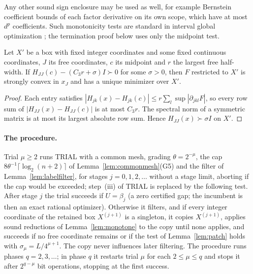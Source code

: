Any other sound sign enclosure may be used as well, for example Bernstein
coefficient bounds \cite{Garloff1986} of each factor derivative on its own
scope, which have at most $d^p$ coefficients. Such monotonicity tests are
standard in interval global optimization
\cite{Hansen1980,HansenWalster2004,ArayaTrombettoniNeveu2010}; the
termination proof below uses only the midpoint test.

\begin{lemma}\label{lem:patch}
Let $X'$ be a box with fixed integer coordinates and some fixed continuous
coordinates, $J$ its free coordinates, $c$ its midpoint and $r$ the largest
free half-width. If $H_{JJ}(c)-(C_3r+\sigma)I\succ0$ for some
$\sigma>0$, then $F$ restricted to $X'$ is strongly convex in $x_J$ and has a
unique minimizer over $X'$.
\end{lemma}

\begin{proof}
Each entry satisfies $|H_{jk}(x)-H_{jk}(c)|\le r\sum_l\sup|\partial_{jkl}F|$,
so every row sum of $|H_{JJ}(x)-H_{JJ}(c)|$ is at most $C_3r$. The spectral
norm of a symmetric matrix is at most its largest absolute row sum. Hence
$H_{JJ}(x)\succ\sigma I$ on $X'$.
\end{proof}

\paragraph{The procedure.}
Trial $\mu\ge2$ runs TRIAL with a common mesh, grading $\theta=2^{-\mu}$,
the cap $8\theta^{-1}\lceil\log_2(n+2)\rceil$ of Lemma~\ref{lem:commonmesh}(G5)
and the filter of Lemma~\ref{lem:labelfilter}, for stages $j=0,1,2,\ldots$
without a stage limit, aborting if the cap would be exceeded; step~(iii) of
TRIAL is replaced by the following test. After stage $j$ the trial succeeds
if $U=\beta_j$ (a zero certified gap; the incumbent is then an exact rational
optimizer). Otherwise it filters, and if every integer coordinate of the
retained box $X^{(j+1)}$ is a singleton, it copies $X^{(j+1)}$, applies sound
reductions of Lemma~\ref{lem:monotone} to the copy until none applies, and
succeeds if no free coordinate remains or if the test of
Lemma~\ref{lem:patch} holds with $\sigma_\mu=L/4^{\mu+1}$. The copy never
influences later filtering. The procedure runs phases $q=2,3,\ldots$; in
phase $q$ it restarts trial $\mu$ for each $2\le\mu\le q$ and stops it after
$2^{q-\mu}$ bit operations, stopping at the first success.

